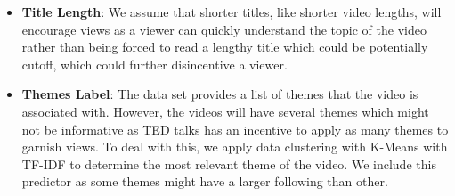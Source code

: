 \begin{itemize}
	\item \textbf{Title Length}: We assume that shorter titles, like shorter video lengths, will encourage views as a viewer can quickly understand the topic of the video rather than being forced to read a lengthy title which could be potentially cutoff, which could further disincentive a viewer.
	\item \textbf{Themes Label}: The data set provides a list of themes that the video is associated with. However, the videos will have several themes which might not be informative as TED talks has an incentive to apply as many themes to garnish views. To deal with this, we apply data clustering with K-Means with TF-IDF to determine the most relevant theme of the video. We include this predictor as some themes might have a larger following than other.
\end{itemize}
\newpage

















